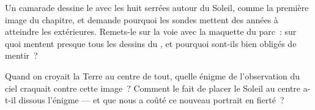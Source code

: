 \begin{exercise}[$\star\star$]\label{exo:g4:solar-system:10}
Un camarade dessine le  avec les huit 
serrées autour du Soleil, comme la première image du chapitre, et
demande pourquoi les sondes mettent des années à atteindre les
 extérieures. Remets-le sur la voie avec la maquette du
parc~: sur quoi mentent presque tous les dessins du ,
et pourquoi sont-ils bien obligés de mentir~?
\end{exercise}

\begin{exercise}[$\star\star$]\label{exo:g4:solar-system:11}
Quand on croyait la Terre au centre de tout, quelle énigme de
l'observation du ciel craquait contre cette image~? Comment le fait
de placer le Soleil au centre a-t-il dissous l'énigme --- et que
nous a coûté ce nouveau portrait en fierté~?
\end{exercise}
